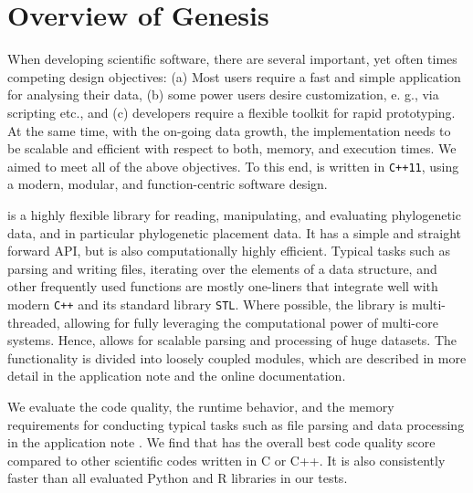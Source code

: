 
\section{Overview of Genesis}
\label{ch:PipelineImplementation:sub:Genesis}


When developing scientific software, there are several important, yet often times competing design objectives:
(a) Most users require a fast and simple application for analysing their data,
(b) some power users desire customization, e. g., via scripting etc., and
(c) developers require a flexible toolkit for rapid prototyping.
At the same time, with the on-going data growth,
the implementation needs to be scalable and efficient with respect to both, memory, and execution times.
We aimed to meet all of the above objectives.
To this end,  is written in \texttt{C++11}, using a modern, modular, and function-centric software design.

 is a highly flexible library for reading, manipulating, and evaluating phylogenetic data,
and in particular phylogenetic placement data.
It has a simple and straight forward API, but is also computationally highly efficient.
Typical tasks such as parsing and writing files, iterating over the elements of a data structure,
and other frequently used functions are mostly one-liners
that integrate well with modern \texttt{C++} and its standard library \texttt{STL}.
Where possible, the library is multi-threaded,
allowing for fully leveraging the computational power of multi-core systems.
Hence,  allows for scalable parsing and processing of huge datasets.
The functionality is divided into loosely coupled modules,
which are described in more detail in the application note \cite{Czech2019-genesis-gappa} and the online documentation.

We evaluate the code quality, the runtime behavior, and the memory requirements
for conducting typical tasks such as file parsing and data processing in the application note \cite{Czech2019-genesis-gappa}.
We find that  has the overall best code quality score compared to other scientific codes written in C or C++.
It is also consistently faster than all evaluated Python and R libraries in our tests.


